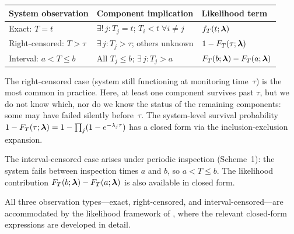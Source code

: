 \begin{center}
\begin{tabular}{lll}
  \toprule
  \textbf{System observation} & \textbf{Component implication} & \textbf{Likelihood term} \\
  \midrule
  Exact: $T = t$ & $\exists!\, j\!: T_j = t$; $T_i < t\;\forall i \neq j$ &
    $f_T(t; \boldsymbol{\lambda})$ \\[4pt]
  Right-censored: $T > \tau$ & $\exists\, j\!: T_j > \tau$; others unknown &
    $1 - F_T(\tau; \boldsymbol{\lambda})$ \\[4pt]
  Interval: $a < T \leq b$ & All $T_j \leq b$; $\exists\, j\!: T_j > a$ &
    $F_T(b; \boldsymbol{\lambda}) - F_T(a; \boldsymbol{\lambda})$ \\
  \bottomrule
\end{tabular}
\end{center}

\noindent
The right-censored case (system still functioning at monitoring time~$\tau$)
is the most common in practice.  Here, at least one component survives past
$\tau$, but we do not know which, nor do we know the status of the remaining
components: some may have failed silently before~$\tau$.  The system-level
survival probability $1 - F_T(\tau; \boldsymbol{\lambda}) = 1 - \prod_j (1 - e^{-\lambda_j \tau})$
has a closed form via the inclusion-exclusion expansion.

The interval-censored case arises under periodic inspection
(Scheme~1): the system fails between inspection times $a$ and $b$, so
$a < T \leq b$.  The likelihood contribution
$F_T(b; \boldsymbol{\lambda}) - F_T(a; \boldsymbol{\lambda})$ is also available in closed form.

All three observation types---exact, right-censored, and
interval-censored---are accommodated by the likelihood framework of
, where the relevant closed-form
expressions are developed in detail.
